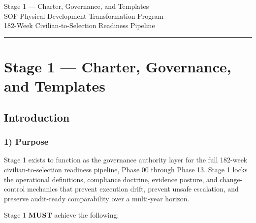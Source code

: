 \documentclass[10pt]{article}
\newcommand{\TitleLine}{\textcolor{StageBlue}{\rule{0.98\linewidth}{0.95pt}}}
\begin{document}
\begin{tcolorbox}
\begin{center}
Stage 1 — Charter, Governance, and Templates\\[0.35em]
SOF Physical Development Transformation Program\\[0.25em]
182-Week Civilian-to-Selection Readiness Pipeline\\[0.65em]
\TitleLine
\end{center}
\end{tcolorbox}

\vspace{0.35em}

\section*{Stage 1 — Charter, Governance, and Templates}
{}

\subsection*{Introduction}
{}

\subsubsection*{1) Purpose}

Stage 1 exists to function as the governance authority layer for the full 182-week civilian-to-selection readiness pipeline, Phase 00 through Phase 13. Stage 1 locks the operational definitions, compliance doctrine, evidence posture, and change-control mechanics that prevent execution drift, prevent unsafe escalation, and preserve audit-ready comparability over a multi-year horizon.

Stage 1 \textbf{MUST} achieve the following:
\end{document}
